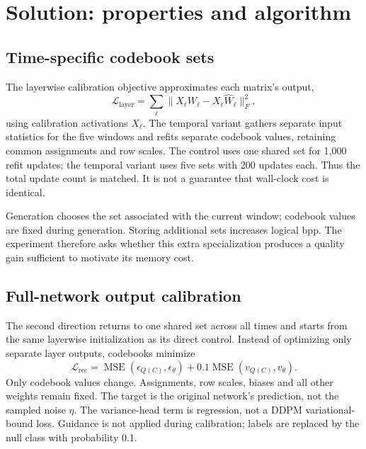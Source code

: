 \documentclass{article}
\begin{document}
\section{Solution: properties and algorithm}
\subsection{Time-specific codebook sets}
The layerwise calibration objective approximates each matrix's output,
\begin{equation}
 \mathcal L_{\mathrm{layer}}=\sum_\ell\|X_\ell W_\ell-X_\ell\widehat W_\ell\|_F^2,
 \label{eq:local}
\end{equation}
using calibration activations $X_\ell$. The temporal variant gathers separate input statistics for the five windows and refits separate codebook values, retaining common assignments and row scales. The control uses one shared set for 1,000 refit updates; the temporal variant uses five sets with 200 updates each. Thus the total update count is matched. It is not a guarantee that wall-clock cost is identical.

Generation chooses the set associated with the current window; codebook values are fixed during generation. Storing additional sets increases logical bpp. The experiment therefore asks whether this extra specialization produces a quality gain sufficient to motivate its memory cost.

\subsection{Full-network output calibration}
The second direction returns to one shared set across all times and starts from the same layerwise initialization as its direct control. Instead of optimizing only separate layer outputs, codebooks minimize
\begin{equation}
 \mathcal L_{\mathrm{rec}}=
 \operatorname{MSE}(\epsilon_{Q(C)},\epsilon_\theta)
 +0.1\operatorname{MSE}(v_{Q(C)},v_\theta).
 \label{eq:kd}
\end{equation}
Only codebook values change. Assignments, row scales, biases and all other weights remain fixed. The target is the original network's prediction, not the sampled noise $\eta$. The variance-head term is regression, not a DDPM variational-bound loss. Guidance is not applied during calibration; labels are replaced by the null class with probability 0.1.
\end{document}
